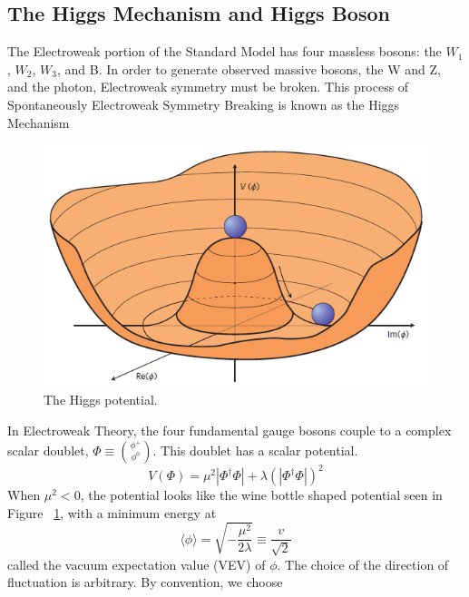 \subsection{The Higgs Mechanism and Higgs Boson}
\label{ssec:Higgs}
The Electroweak portion of the Standard Model has four massless bosons: the $W_{1}$, $W_{2}$, $W_{3}$, and B. In order to generate observed massive bosons, the W and Z, and the photon, Electroweak symmetry must be broken. This process of Spontaneously Electroweak Symmetry Breaking is known as the Higgs Mechanism\newline

\begin{figure}[h]
\begin{center}
\includegraphics[scale=0.65]{figures/higgspotential}
\caption[The Higgs potential]{The Higgs potential.\cite{Ellis:1638469}}
\label{Fig:higgspot}
\end{center}
\end{figure}

\indent In Electroweak Theory, the four fundamental gauge bosons couple to a complex scalar doublet, ${\Phi \equiv \binom{\phi^{+}}{\phi^{0}}}$. This doublet has a scalar potential.
\begin{equation}
\label{eq:higgsPot}
V(\Phi) = \mu^{2}|\Phi^{\dagger}\Phi| + \lambda(|\Phi^{\dagger}\Phi|)^{2}
\end{equation}
When ${\mu^{2} < 0}$, the potential looks like the wine bottle shaped potential seen in Figure ~\ref{Fig:higgspot}, with a minimum energy at 
\begin{equation}
\langle \phi \rangle = \sqrt{-\frac{\mu^{2}}{2\lambda}}\equiv \frac{v}{\sqrt{2}}
\end{equation}
called the vacuum expectation value (VEV) of ${\phi}$. The choice of the direction of fluctuation is arbitrary. By convention, we choose


